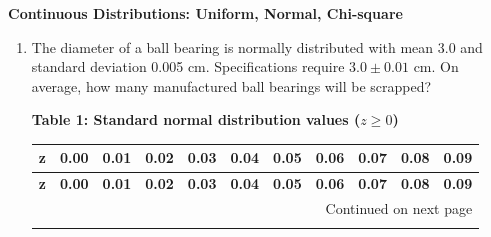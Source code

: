 \documentclass[12pt,a4paper]{article}
\newcommand{\subtopic}[2]{%
  \vspace{10pt}
  \noindent\begin{tcolorbox}[colback=#1!8,colframe=#1,boxrule=0.6pt,arc=4pt,
    left=6pt,right=6pt,top=4pt,bottom=4pt]
    \small\bfseries\textcolor{#1}{#2}
  \end{tcolorbox}
  \vspace{2pt}
}
\begin{document}
\subtopic{cG}{Continuous Distributions: Uniform, Normal, Chi-square}

\label{sub:s8-continuous}

\begin{enumerate}\item The diameter of a ball bearing is normally distributed with mean 3.0 and standard deviation 0.005 cm. Specifications require $3.0\pm0.01$ cm. On average, how many manufactured ball bearings will be scrapped?


\begin{flushleft}
    \textbf{\Large Table 1: Standard normal distribution values ($z \ge 0$)}
\end{flushleft}
\vspace{0.2cm}

\begin{center}
\small %
\setlength{\tabcolsep}{4pt} %
\renewcommand{\arraystretch}{1.2} %

\begin{longtable}{c | cccccccccc}
\toprule
\textbf{z} & \textbf{0.00} & \textbf{0.01} & \textbf{0.02} & \textbf{0.03} & \textbf{0.04} & \textbf{0.05} & \textbf{0.06} & \textbf{0.07} & \textbf{0.08} & \textbf{0.09} \\
\midrule
\endfirsthead

\toprule
\textbf{z} & \textbf{0.00} & \textbf{0.01} & \textbf{0.02} & \textbf{0.03} & \textbf{0.04} & \textbf{0.05} & \textbf{0.06} & \textbf{0.07} & \textbf{0.08} & \textbf{0.09} \\
\midrule
\endhead

\midrule
\multicolumn{11}{r}{{Continued on next page}} \\
\bottomrule
\endfoot


\end{longtable}
\end{center}
\end{enumerate}
\end{document}
